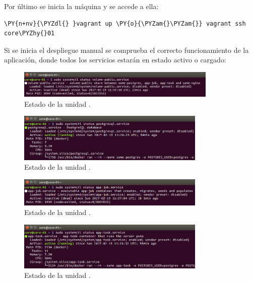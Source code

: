 Por último se inicia la máquina y se accede a ella: 

\begin{framed_shaded}
\begin{Verbatim}[fontsize=\relsize{-2.5},fontseries=b,commandchars=\\\{\}]
\PY{n+nv}{\PYZdl{} }vagrant up \PY{o}{\PYZam{}\PYZam{}} vagrant ssh core\PYZhy{}01
\end{Verbatim}
\end{framed_shaded}

Si se inicia el despliegue manual se comprueba el correcto funcionamiento de la aplicación, donde todos los servicios estarán en estado activo o cargado:

\begin{figure}[H]
\centering
\includegraphics[width=0.85\textwidth]{images/figures/volume-public.service.png}
\caption{Estado de la unidad .}
\end{figure}

\begin{figure}[H]
\centering
\includegraphics[width=0.8\textwidth]{images/figures/postgresql.service.png}
\caption{Estado de la unidad .}
\end{figure}

\begin{figure}[H]
\centering
\includegraphics[width=0.8\textwidth]{images/figures/app-job.service.png}
\caption{Estado de la unidad .}
\end{figure}

\begin{figure}[H]
\centering
\includegraphics[width=0.8\textwidth]{images/figures/app-task.service.png}
\caption{Estado de la unidad .}
\end{figure}

